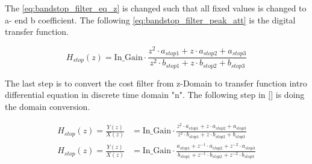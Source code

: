 The \autoref{eq:bandstop_filter_eq_z} is changed such that all fixed values is changed to a- end b coefficient. The following \autoref{eq:bandstop_filter_peak_att} is the digital transfer function.


\begin{equation}\label{eq:bandstop_filter_peak_att}
        H_{stop}(z) =  \text{In_Gain} \cdot \frac{z^2 \cdot a_{stop1} + z \cdot a_{stop2} + a_{stop3}}{z^2 \cdot b_{stop1} + z \cdot b_{stop2} + b_{stop3}}
    \end{equation}
    
    \startexplain
    \stopexplain

The last step is to convert the cost filter from z-Domain to transfer function intro differential equation in discrete time domain "n". The following step in \autoref{} is doing the domain conversion.



\begin{subequations}\label{eq:bandstop_filter_peak_n}
\begin{alignat}{2}
 H_{stop}(z)=\frac{Y(z)}{X(z)} &=  \text{In_Gain} \cdot \frac{z^2 \cdot a_{stop1} + z \cdot a_{stop2} + a_{stop3}}{z^2 \cdot b_{stop1} + z \cdot b_{stop2} + b_{stop3}} \label{eq:bandstop_filter_peak_n_1}\\
 H_{stop}(z)=\frac{Y(z)}{X(z)} &=  \text{In_Gain} \cdot \frac{a_{stop1} + z^{-1} \cdot a_{stop2} +  z^{-2} \cdot a_{stop3}}{b_{stop1} + z^{-1} \cdot b_{stop2} +  z^{-2} \cdot b_{stop3}}  \label{eq:bandstop_filter_peak_n_2}
\end{alignat}
\end{subequations}


